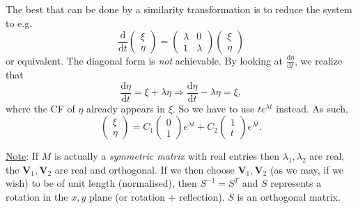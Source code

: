 \documentclass[12pt]{report}
\theoremstyle{definition}
\begin{document}
\begin{itemize}
\begin{enumerate}[label = (\roman*)]
                    The best that can be done by a similarity transformation
                    is to reduce the system to e.g.\[
                        \frac{\mathrm{d}}{\mathrm{d}t} \begin{pmatrix}
                                \xi \\
                                \eta
                        \end{pmatrix} = \begin{pmatrix}
                        \lambda & 0 \\
                        1 & \lambda
                        \end{pmatrix} \begin{pmatrix}
                                \xi \\
                                \eta
                        \end{pmatrix}
                    \]or equivalent. The diagonal form is \emph{not} achievable. 
                    By looking at $\frac{\mathrm{d}\eta}{\mathrm{d}t} $, we realize that\[
                        \frac{\mathrm{d}\eta}{\mathrm{d}t} = \xi + \lambda \eta
                        \Rightarrow{}\frac{\mathrm{d}\eta}{\mathrm{d}t} - \lambda \eta = \xi,
                    \]
                    where the CF of $\eta$ already appears in $\xi$.
                    So we have to use $t e^{\lambda t}$ instead. As such,\[
                        \begin{pmatrix}
                                \xi \\
                                \eta
                        \end{pmatrix} = C_1 \begin{pmatrix}
                                0 \\
                                1
                        \end{pmatrix} e^{\lambda t} + C_2 \begin{pmatrix}
                                1 \\
                                t
                        \end{pmatrix} e^{\lambda t}.
                    \]
            \end{enumerate}
\end{itemize}

\underline{Note}: If $M$ is actually a \emph{symmetric matrix} with real entries then
$\lambda_1, \lambda_2$ are real, the $\mathbf{V}_1, \mathbf{V}_2$ are real and orthogonal.
If we then choose $\mathbf{V}_1, \mathbf{V}_2$ (as we may, if we wish) to be of unit length (normalised),
then $S^{-1} = S^{T}$ and $S$ represents a rotation in the $x, y$ plane (or rotation + reflection).
$S$ is an orthogonal matrix.
\end{document}
